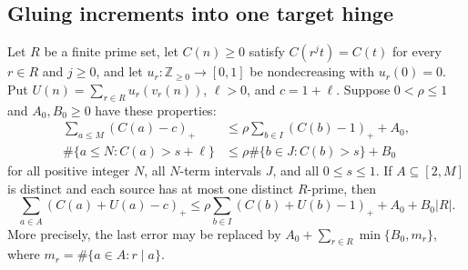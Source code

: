 \subsection{Gluing increments into one target hinge}

\begin{lemma}
\label{cg:gluing}
Let $R$ be a finite prime set, let $C(n)\ge0$ satisfy
$C(r^jt)=C(t)$ for every $r\in R$ and $j\ge0$, and let
$u_r:\mathbb Z_{\ge0}\to[0,1]$ be nondecreasing with $u_r(0)=0$.
Put $U(n)=\sum_{r\in R}u_r(v_r(n))$, $\ell>0$, and $c=1+\ell$.
Suppose $0<\rho\le1$ and $A_0,B_0\ge0$ have these properties:
\begin{align}
 \sum_{a\le M}(C(a)-c)_+
 &\le\rho\sum_{b\in I}(C(b)-1)_++A_0,
 \label{cg:base-assumption}\\
 \#\{a\le N:C(a)>s+\ell\}
 &\le\rho\#\{b\in J:C(b)>s\}+B_0
 \label{cg:level-assumption}
\end{align}
for all positive integer $N$, all $N$-term intervals $J$, and all
$0\le s\le1$. If $A\subseteq[2,M]$ is distinct and each source
has at most one distinct $R$-prime, then
\begin{equation}
 \sum_{a\in A}(C(a)+U(a)-c)_+
 \le\rho\sum_{b\in I}(C(b)+U(b)-1)_+
       +A_0+B_0|R|.
 \label{cg:gluing-conclusion}
\end{equation}
More precisely, the last error may be replaced by
$A_0+\sum_{r\in R}\min\{B_0,m_r\}$, where
$m_r=\#\{a\in A:r\mid a\}$.
\end{lemma}

